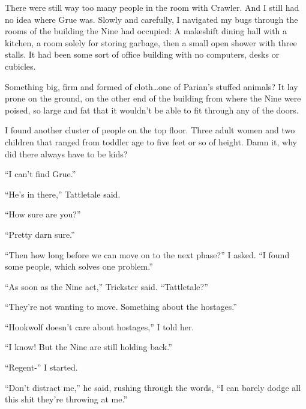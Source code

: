 There were still way too many people in the room with Crawler.  And I still had no idea where Grue was.  Slowly and carefully, I navigated my bugs through the rooms of the building the Nine had occupied: A makeshift dining hall with a kitchen, a room solely for storing garbage, then a small open shower with three stalls.  It had been some sort of office building with no computers, desks or cubicles.



Something big, firm and formed of cloth\ldots one of Parian's stuffed animals?  It lay prone on the ground, on the other end of the building from where the Nine were poised, so large and fat that it wouldn't be able to fit through any of the doors.



I found another cluster of people on the top floor.  Three adult women and two children that ranged from toddler age to five feet or so of height.  Damn it, why did there always have to be kids?



``I can't find Grue.''



``He's in there,'' Tattletale said.



``How sure are you?''



``Pretty darn sure.''



``Then how long before we can move on to the next phase?'' I asked.  ``I found some people, which solves one problem.''



``As soon as the Nine act,'' Trickster said.  ``Tattletale?''



``They're not wanting to move.  Something about the hostages.''



``Hookwolf doesn't care about hostages,'' I told her.



``I know!  But the Nine are still holding back.''



``Regent-'' I started.



``Don't distract me,'' he said, rushing through the words, ``I can barely dodge all this shit they're throwing at me.''




